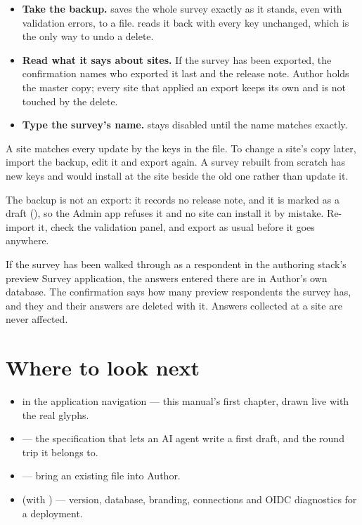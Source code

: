 \documentclass[11pt, a4paper]{article}
\begin{document}
\begin{itemize}
  \item \textbf{Take the backup.}  saves the whole survey exactly as it stands,
        even with validation errors, to a  file.  reads
        it back with every key unchanged, which is the only way to undo a delete.
  \item \textbf{Read what it says about sites.} If the survey has been exported, the confirmation
        names who exported it last and the release note. Author holds the master copy; every site
        that applied an export keeps its own and is not touched by the delete.
  \item \textbf{Type the survey's name.}  stays disabled until the name matches
        exactly.
\end{itemize}


\begin{elicitnote}
A site matches every update by the keys in the file. To change a site's copy later, import the
backup, edit it and export again. A survey rebuilt from scratch has new keys and would install at
the site beside the old one rather than update it.
\end{elicitnote}

The backup is not an export: it records no release note, and it is marked as a draft
(), so the Admin app refuses it and no site can install it
by mistake. Re-import it, check the validation panel, and export as usual before it goes
anywhere.

If the survey has been walked through as a respondent in the authoring stack's preview Survey
application, the answers entered there are in Author's own database. The confirmation says how many
preview respondents the survey has, and they and their answers are deleted with it. Answers
collected at a site are never affected.

\section{Where to look next}
\label{sec:next}

\begin{itemize}
  \item {} in the application navigation — this manual's first chapter, drawn
        live with the real glyphs.
  \item {} — the specification that lets an AI agent write a first draft,
        and the round trip it belongs to.
  \item {} — bring an existing  file into Author.
  \item {} (with ) — version, database, branding, connections
        and OIDC diagnostics for a deployment.
\end{itemize}
\end{document}
